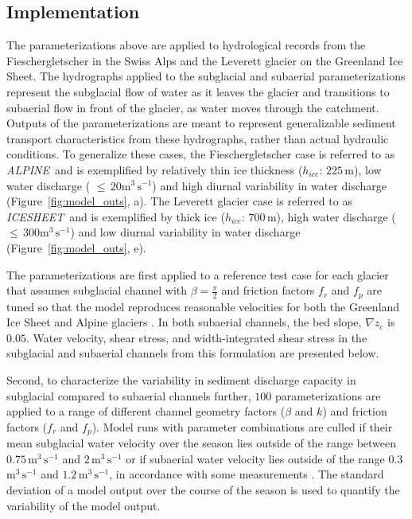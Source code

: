 \documentclass[11pt]{article}
\newcommand{\alpine}{\textit{ALPINE}\,}
\newcommand{\icesheet}{\textit{ICESHEET}\,}
\newcommand{\unit}[1]{$\mathrm{#1}$}
\begin{document}
\subsection{Implementation}
\label{sect:imp}

The parameterizations above are applied to hydrological records from the Fieschergletscher in the Swiss Alps and the Leverett glacier on the Greenland Ice Sheet.
The hydrographs applied to the subglacial and subaerial parameterizations represent the subglacial flow of water as it leaves the glacier and transitions to subaerial flow in front of the glacier, as water moves through the catchment.
Outputs of the parameterizations are meant to represent generalizable sediment transport characteristics from these hydrographs, rather than actual hydraulic conditions.
To generalize these cases, the Fieschergletscher case is referred to as \alpine{} and is exemplified by relatively thin ice thickness ($h_{ice}$: $225$\,\unit{m}), low water discharge ( $\le\,20$\unit{m}$^3$\,\unit{s}$^{-1}$) and high diurnal variability in water discharge (Figure~\ref{fig:model_outs}, a).
The Leverett glacier case is referred to as \icesheet{} and is exemplified by thick ice  ($h_{ice}$: $700$\,\unit{m}), high water discharge ($\le\,300$\unit{m}$^3$\,\unit{s}$^{-1}$)  and low diurnal variability in water discharge (Figure~\ref{fig:model_outs}, e).

The parameterizations are first applied to a reference test case for each glacier that assumes  subglacial channel with $\beta=\frac{\pi}{2}$ and friction factors $f_r$ and $f_p$ are tuned so that the model reproduces reasonable velocities for both  the Greenland Ice Sheet and Alpine glaciers \citep[$\sim\,1.6\,$\unit{m}$^3$\,\unit{s}$^{-1}$][]{werder2010b,chandler2013}.
In both subaerial channels, the bed slope, $\nabla z_c$ is $0.05$.
Water velocity, shear stress, and width-integrated shear stress in the subglacial and subaerial channels from this formulation are presented below.  

Second, to characterize the variability in sediment discharge capacity in subglacial compared to subaerial channels further, $100$  parameterizations are applied to a range of different channel geometry factors ($\beta$ and $k$) and friction factors ($f_r$ and $f_p$).
Model runs with parameter combinations  are culled if their mean subglacial water velocity over the season lies outside of the range between $0.75$\,\unit{m}$^3$\,\unit{s}$^{-1}$ and $2$\,\unit{m}$^3$\,\unit{s}$^{-1}$ or if subaerial water velocity lies outside of the range $0.3$\,\unit{m}$^3$\,\unit{s}$^{-1}$ and $1.2$\,\unit{m}$^3$\,\unit{s}$^{-1}$, in accordance with some measurements \citep[e.g.]{werder2010b,magnusson2012,chandler2013}.
The standard deviation of a model output over the course of the season is used to quantify the variability of the model output.
\end{document}
